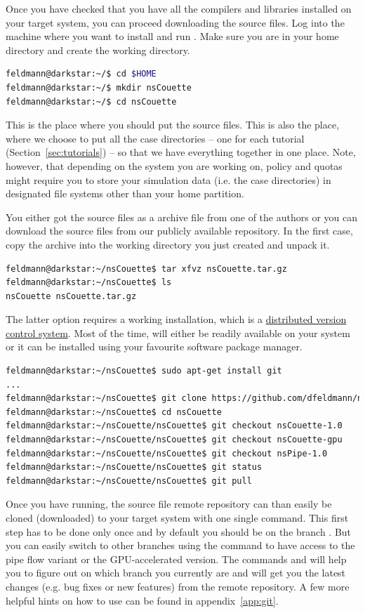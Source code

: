 \documentclass[a4paper, 11pt, DIV=11]{scrartcl}
\begin{document}
Once you have checked that you have all the compilers and libraries installed
on your target system, you can proceed downloading the \nsc source files. Log
into the machine where you want to install and run \nsc. Make sure you are in
your home directory and create the \nsc working directory.
\begin{lstlisting}[language=bash]
feldmann@darkstar:~/$ cd $HOME
feldmann@darkstar:~/$ mkdir nsCouette
feldmann@darkstar:~/$ cd nsCouette
\end{lstlisting}
This is the place where you should put the source files. This is also the place, 
where we choose to put all the case directories -- one for each tutorial
(Section~\ref{sec:tutorials}) -- so that we have everything together in one place. Note,
however, that depending on the system you are working on, policy and quotas might
require you to store your simulation data (i.e. the case directories) in
designated file systems other than your home partition.
\par
You either got the source files as a  archive file from one of the
authors or you can download the source files from our publicly available
\href{https://github.com/dfeldmann/nsCoutte}{} repository.
In the first case, copy the archive into the working directory you just created
and unpack it.
\begin{lstlisting}[language=bash]
feldmann@darkstar:~/nsCouette$ tar xfvz nsCouette.tar.gz
feldmann@darkstar:~/nsCouette$ ls
nsCouette nsCouette.tar.gz
\end{lstlisting}
The latter option requires a working  installation, which is a
\href{https://git-scm.com/}{distributed version control system}. Most of
the time,  will either be readily available on your system or
it can be installed using your favourite software package manager.
\begin{lstlisting}[language=bash]
feldmann@darkstar:~/nsCouette$ sudo apt-get install git
...
feldmann@darkstar:~/nsCouette$ git clone https://github.com/dfeldmann/nsCouette
feldmann@darkstar:~/nsCouette$ cd nsCouette
feldmann@darkstar:~/nsCouette/nsCouette$ git checkout nsCouette-1.0
feldmann@darkstar:~/nsCouette/nsCouette$ git checkout nsCouette-gpu
feldmann@darkstar:~/nsCouette/nsCouette$ git checkout nsPipe-1.0
feldmann@darkstar:~/nsCouette/nsCouette$ git status
feldmann@darkstar:~/nsCouette/nsCouette$ git pull
\end{lstlisting}
Once you have  running, the \nsc source file remote
repository can than easily be cloned (downloaded) to your target
system with one single command. This first step has to be done
only once and by default you should be on the branch .
But you can easily switch to other branches using the
 command to have access to the pipe flow variant
or the GPU-accelerated \cuda version. The
 commands  and  will help you
to figure out on which branch you currently are and will get you
the latest changes (e.g. bug fixes or new features) from the remote
repository. A few more helpful hints on how to use  can
be found in appendix~\ref{app:git}.  
\end{document}
